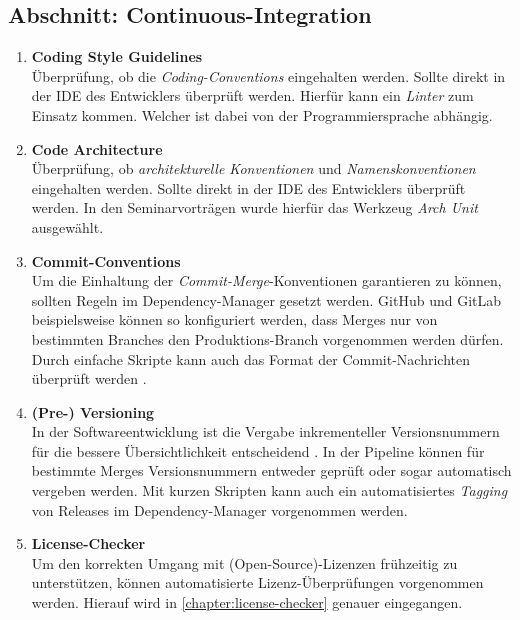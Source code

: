 \subsection{Abschnitt: Continuous-Integration}
\begin{enumerate}[resume]
    \itemsep-0.5em 
    \item \textbf{Coding Style Guidelines}\label{Coding Style Guidelines} \\
        Überprüfung, ob die \emph{Coding-Conventions} eingehalten werden. Sollte direkt in der IDE des Entwicklers überprüft werden. Hierfür kann ein \emph{Linter} \cite{guimaraesWhatLinterWhy2020} zum Einsatz kommen. Welcher ist dabei von der Programmiersprache abhängig.
    \item \textbf{Code Architecture}\label{Code Architecture} \\
        Überprüfung, ob \emph{architekturelle Konventionen} und \emph{Namenskonventionen} eingehalten werden. Sollte direkt in der IDE des Entwicklers überprüft werden. In den Seminarvorträgen wurde hierfür das Werkzeug \emph{Arch Unit} \cite{gafertArchUnit} ausgewählt.
    \item \textbf{Commit-Conventions}\label{Commit-Conventions} \\
        Um die Einhaltung der \emph{Commit-Merge}-Konventionen garantieren zu können, sollten Regeln im Dependency-Manager gesetzt werden. GitHub und GitLab beispielsweise können so konfiguriert werden, dass Merges nur von bestimmten Branches den Produktions-Branch vorgenommen werden dürfen. Durch einfache Skripte kann auch das Format der Commit-Nachrichten überprüft werden \cite{ConventionalCommits}.
    \item \textbf{(Pre-) Versioning}\label{(Pre-) Versioning} \\
        In der Softwareentwicklung ist die Vergabe inkrementeller Versionsnummern für die bessere Übersichtlichkeit entscheidend \cite{preston-wernerSemanticVersioning}. In der Pipeline können für bestimmte Merges Versionsnummern entweder geprüft oder sogar automatisch vergeben werden. Mit kurzen Skripten kann auch ein automatisiertes \emph{Tagging} von Releases im Dependency-Manager vorgenommen werden.
    \item \textbf{License-Checker}\label{License-Checker} \\
        Um den korrekten Umgang mit (Open-Source)-Lizenzen frühzeitig zu unterstützen, können automatisierte Lizenz-Überprüfungen vorgenommen werden. Hierauf wird in \autoref{chapter:license-checker} genauer eingegangen.
\end{enumerate}

